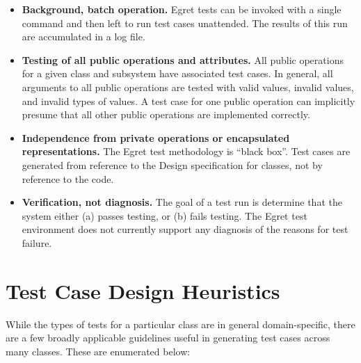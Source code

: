 \begin{itemize}
\item {\bf Background, batch operation.} Egret tests can be invoked
  with a single command and then left to run test cases unattended.
  The results of this run are accumulated in a log file.
  
\item {\bf Testing of all public operations and attributes.} All
  public operations for a given class and subsystem have associated
  test cases.  In general, all arguments to all public operations are
  tested with valid values, invalid values, and invalid types of
  values.  A test case for one public operation can implicitly presume
  that all other public operations are implemented correctly.
  
\item {\bf Independence from private operations or encapsulated
  representations.} The Egret test methodology is ``black box''.  Test
  cases are generated from reference to the Design specification for
  classes, not by reference to the code.  
  
\item {\bf Verification, not diagnosis.} The goal of a test run is
  determine that the system either (a) passes testing, or (b) fails
  testing.  The Egret test environment does not currently support any
  diagnosis of the reasons for test failure.
  
\end{itemize}

\section{Test Case Design Heuristics}

While the types of tests for a particular class are in general
domain-specific, there are a few broadly applicable guidelines 
useful in generating test cases across many classes. These are
enumerated below:


